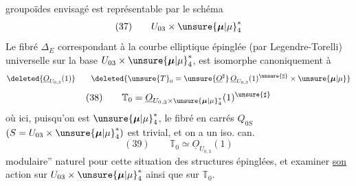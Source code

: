 
groupoïdes envisagé est représentable par le schéma
\[
(37)\qquad U_{03}\times\unsure{\boldsymbol{\mu}|\mu}_4^*
\]
Le fibré $\Delta_E$ correspondant à la courbe elliptique épinglée (par Legendre-Torelli) universelle sur la base $U_{03}\times\unsure{\boldsymbol{\mu}|\mu}_4^*$, est isomorphe canoniquement à
\[
\deleted{\underline{O}_{U_{0,3}}(1)}\qquad\deleted{\unsure{T}_0=\unsure{\underline{O}^{\sharp}}\,\underline{O}_{U_{0,3}}(1)^{\unsure{\sharp}}\times\unsure{\boldsymbol{\mu}|\mu}}
\]
\[
(38)\qquad\mathbb{T}_0=\underline{O}_{U_{0,3}\times\unsure{\boldsymbol{\mu}|\mu}_4^*}(1)^{\unsure{\sharp}}
\]
où ici, puisqu'on est  $\unsure{\boldsymbol{\mu}|\mu}_4^*$, le fibré en carrés $Q_{0S}$ $(S=U_{03}\times\unsure{\boldsymbol{\mu}|\mu}_4^*)$ est trivial, et on a un iso. can.
\[
(39)\qquad\mathbb{T}_0\simeq\underline{O}_{U_{0,3}}(1)
\]
 modulaire'' naturel pour cette situation des  structures épinglées, et examiner \uline{son} action sur $U_{03}\times\unsure{\boldsymbol{\mu}|\mu}_4^*$ ainsi que sur $\mathbb{T}_0$.
